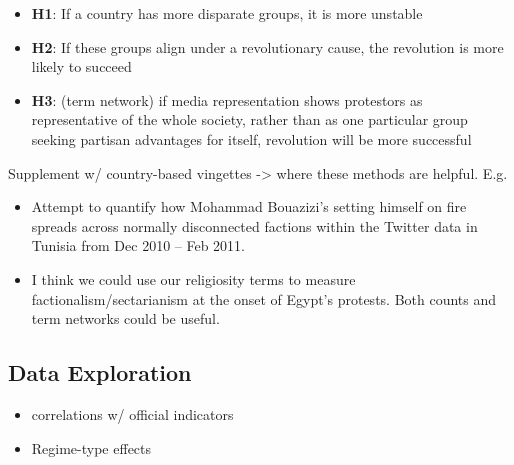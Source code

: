 \begin{itemize}
	\item {\bf H1}: If a country has more disparate groups, it is more unstable
	\item {\bf H2}: If these groups align under a revolutionary cause, the revolution is more likely to succeed
	\item {\bf H3}: (term network) if media representation shows protestors as representative of the whole society, rather than as one particular group seeking partisan advantages for itself, revolution will be more successful
\end{itemize}

Supplement w/ country-based vingettes -> where these methods are helpful. E.g.
\begin{itemize}
 	\item Attempt to quantify how Mohammad Bouazizi’s setting himself on fire spreads across normally disconnected factions within the Twitter data in Tunisia from Dec 2010 – Feb 2011.
 	\item I think we could use our religiosity terms to measure factionalism/sectarianism at the onset of Egypt’s protests.  Both counts and term networks could be useful.
\end{itemize}


\subsection{Data Exploration}

\begin{itemize}
	\item correlations w/ official indicators
	\item Regime-type effects
\end{itemize}


